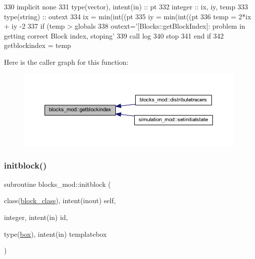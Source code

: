 \begin{DoxyCode}
330     \textcolor{keywordtype}{implicit none}
331     \textcolor{keywordtype}{type}(vector), \textcolor{keywordtype}{intent(in)} :: pt
332     \textcolor{keywordtype}{integer} :: ix, iy, temp
333     \textcolor{keywordtype}{type}(string) :: outext
334     ix = min(int((pt%
335     iy = min(int((pt%
336     temp = 2*ix + iy -2
337     \textcolor{keywordflow}{if} (temp > globals%
338         outext=\textcolor{stringliteral}{'[Blocks::getBlockIndex]: problem in getting correct Block index, stoping'}
339         \textcolor{keyword}{call }log%
340         stop
341 \textcolor{keywordflow}{    end if}
342     getblockindex = temp
\end{DoxyCode}
Here is the caller graph for this function\+:\nopagebreak
\begin{figure}[H]
\begin{center}
\leavevmode
\includegraphics[width=350pt]{namespaceblocks__mod_a62e8fb0d6b2535b4499c7a4d848c24ba_icgraph}
\end{center}
\end{figure}
\mbox{\label{namespaceblocks__mod_a534ca69b17b6f54ee07f995b02feff39}} 
\subsubsection{\texorpdfstring{initblock()}{initblock()}}
{\footnotesize\ttfamily subroutine blocks\+\_\+mod\+::initblock (\begin{DoxyParamCaption}\item[{class(\mbox{\hyperlink{structblocks__mod_1_1block__class}{block\+\_\+class}}), intent(inout)}]{self,  }\item[{integer, intent(in)}]{id,  }\item[{type(\mbox{\hyperlink{structgeometry__mod_1_1box}{box}}), intent(in)}]{templatebox }\end{DoxyParamCaption})\hspace{0.3cm}{\ttfamily [private]}}



